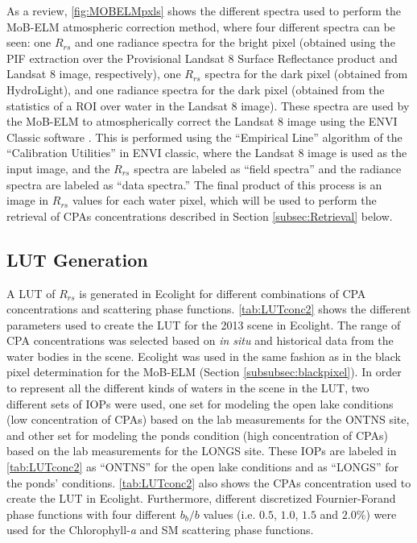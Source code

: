 \documentclass[onecolumn,3p,letterpaper,11pt]{elsarticle}
\begin{document}
As a review, \autoref{fig:MOBELMpxls} shows the different spectra used to perform the MoB-ELM atmospheric correction method, where four different spectra can be seen: one $R_{rs}$ and one radiance spectra for the bright pixel (obtained using the PIF extraction over the Provisional Landsat 8 Surface Reflectance product and Landsat 8 image, respectively), one $R_{rs}$ spectra for the dark pixel (obtained from HydroLight), and one radiance spectra for the dark pixel (obtained from the statistics of a ROI over water in the Landsat 8 image). These spectra are used by the MoB-ELM to atmospherically correct the Landsat 8 image using the ENVI Classic software \citep{ENVIUserGuide}. This is performed using the ``Empirical Line'' algorithm of the ``Calibration Utilities'' in ENVI classic, where the Landsat 8 image is used as the input image, and the $R_{rs}$ spectra are labeled as ``field spectra'' and the radiance spectra are labeled as ``data spectra.'' The final product of this process is an image in $R_{rs}$ values for each water pixel, which will be used to perform the retrieval of CPAs concentrations described in Section \ref{subsec:Retrieval} below. 
\subsection{LUT Generation}
\label{subsec:LUT}
A LUT of $R_{rs}$ is generated in Ecolight for different combinations of CPA concentrations and scattering phase functions. \autoref{tab:LUTconc2} shows the different parameters used to create the LUT for the 2013 scene in Ecolight. The range of CPA concentrations was selected based on {\it in situ} and historical data from the water bodies in the scene. Ecolight was used in the same fashion as in the black pixel determination for the MoB-ELM (Section \ref{subsubsec:blackpixel}). In order to represent all the different kinds of waters in the scene in the LUT, two different sets of IOPs were used, one set for modeling the open lake conditions (low concentration of CPAs) based on the lab measurements for the ONTNS site, and other set for modeling the ponds condition (high concentration of CPAs) based on the lab measurements for the LONGS site. These IOPs are labeled in \autoref{tab:LUTconc2} as ``ONTNS'' for the open lake conditions and as ``LONGS'' for the ponds' conditions. \autoref{tab:LUTconc2} also shows the CPAs concentration used to create the LUT in Ecolight. Furthermore, different discretized Fournier-Forand phase functions with four different $b_b/b$ values (i.e. $0.5$, $1.0$, $1.5$ and $2.0\%$) were used for the Chlorophyll-{\it a} and SM scattering phase functions.
\end{document}
